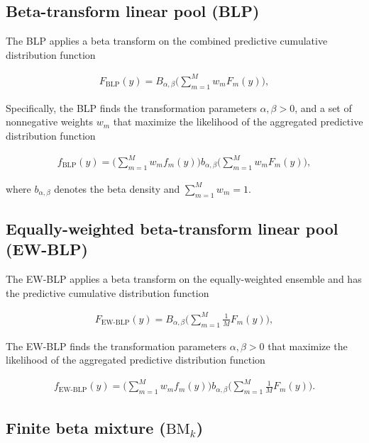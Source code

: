 \documentclass[
]{article}
\begin{document}
\hypertarget{beta-transform-linear-pool-blp}{%
\subsection{Beta-transform linear pool
(BLP)}\label{beta-transform-linear-pool-blp}}

The BLP applies a beta transform on the combined predictive cumulative
distribution function

\begin{align}
F_{\text{BLP}}(y)=B_{\alpha,\beta}\Big(\sum_{m=1}^M w_m F_m(y)\Big),
\end{align}

Specifically, the BLP finds the transformation parameters
\(\alpha,\beta > 0\), and a set of nonnegative weights \(w_m\) that
maximize the likelihood of the aggregated predictive distribution
function

\begin{align}
f_{\text{BLP}}(y)=\Big(\sum_{m=1}^M w_mf_m(y)\Big)b_{\alpha,\beta}\Big(\sum_{m=1}^M w_m F_m(y)\Big),
\end{align}

where \(b_{\alpha,\beta}\) denotes the beta density and
\(\sum_{m=1}^M w_m=1\).

\hypertarget{equally-weighted-beta-transform-linear-pool-ew-blp}{%
\subsection{Equally-weighted beta-transform linear pool
(EW-BLP)}\label{equally-weighted-beta-transform-linear-pool-ew-blp}}

The EW-BLP applies a beta transform on the equally-weighted ensemble and
has the predictive cumulative distribution function

\begin{align}
F_{\text{EW-BLP}}(y)=B_{\alpha,\beta}\Big(\sum_{m=1}^M \frac{1}{M} F_m(y)\Big),
\end{align}

The EW-BLP finds the transformation parameters \(\alpha,\beta > 0\) that
maximize the likelihood of the aggregated predictive distribution
function

\begin{align}
f_{\text{EW-BLP}}(y)=\Big(\sum_{m=1}^M w_mf_m(y)\Big)b_{\alpha,\beta}\Big(\sum_{m=1}^M \frac{1}{M} F_m(y)\Big).
\end{align}

\hypertarget{finite-beta-mixture-textbm_k}{%
\subsection{\texorpdfstring{Finite beta mixture
(\(\text{BM}_k\))}{Finite beta mixture (\textbackslash text\{BM\}\_k)}}\label{finite-beta-mixture-textbm_k}}
\end{document}
